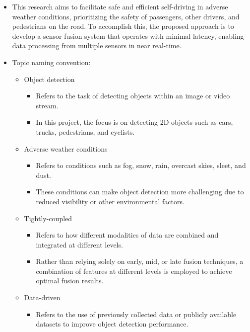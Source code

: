 \documentclass[rnd]{mas_proposal}
\begin{document}
\begin{itemize}
    \item This research aims to facilitate safe and efficient self-driving in adverse weather conditions, prioritizing the safety of passengers, other drivers, and pedestrians on the road. To accomplish this, the proposed approach is to develop a sensor fusion system that operates with minimal latency, enabling data processing from multiple sensors in near real-time.

          \newpage

    \item Topic naming convention:
          \begin{itemize}
              \item Object detection
                    \begin{itemize}
                        \item Refers to the task of detecting objects within an image or video stream.
                        \item In this project, the focus is on detecting 2D objects such as cars, trucks, pedestrians, and cyclists.
                    \end{itemize}
              \item Adverse weather conditions
                    \begin{itemize}
                        \item Refers to conditions such as fog, snow, rain, overcast skies, sleet, and dust.
                        \item These conditions can make object detection more challenging due to reduced visibility or other environmental factors.
                    \end{itemize}
              \item Tightly-coupled
                    \begin{itemize}
                        \item Refers to how different modalities of data are combined and integrated at different levels.
                        \item Rather than relying solely on early, mid, or late fusion techniques, a combination of features at different levels is employed to achieve optimal fusion results.
                    \end{itemize}
              \item Data-driven
                    \begin{itemize}
                        \item Refers to the use of previously collected data or publicly available datasets to improve object detection performance.

\end{itemize}
\end{itemize}
\end{itemize}
\end{document}
